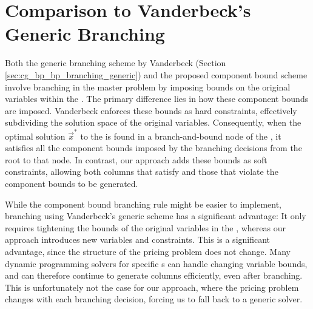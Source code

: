 \section{Comparison to Vanderbeck's Generic Branching}\label{sec:cmpbnd_simdif}
Both the generic branching scheme by Vanderbeck (Section \ref{sec:cg_bp_bp_branching_generic}) and the proposed component bound scheme involve branching in the master problem by imposing bounds on the original variables within the \SP{}. The primary difference lies in how these component bounds are imposed. Vanderbeck enforces these bounds as hard constraints, effectively subdividing the solution space of the original variables. Consequently, when the optimal solution $\vec{x}^*$ to the \IP{} is found in a branch-and-bound node of the \RMP{}, it satisfies all the component bounds imposed by the branching decisions from the root to that node. In contrast, our approach adds these bounds as soft constraints, allowing both columns that satisfy and those that violate the component bounds to be generated.

While the component bound branching rule might be easier to implement, branching using Vanderbeck's generic scheme has a significant advantage: It only requires tightening the bounds of the original variables in the \SP{}, whereas our approach introduces new variables and constraints. This is a significant advantage, since the structure of the pricing problem does not change. Many dynamic programming solvers for specific \IP{}s can handle changing variable bounds, and can therefore continue to generate columns efficiently, even after branching. This is unfortunately not the case for our approach, where the pricing problem changes with each branching decision, forcing us to fall back to a generic \IP{} solver.
